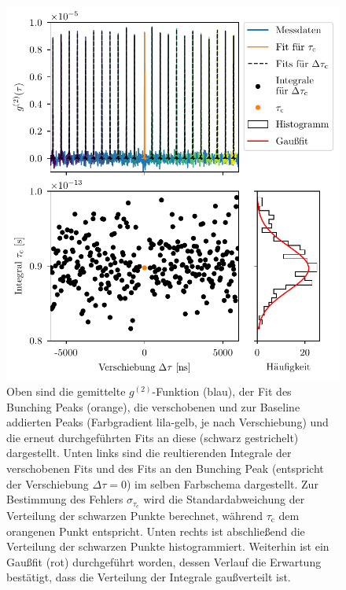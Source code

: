 \begin{figure}[hp]
    \centering
    \includegraphics{images/Analysis/integration_error.pdf}
    \caption{Oben sind die gemittelte $g^{(2)}$-Funktion (blau), der Fit des Bunching Peaks (orange), die verschobenen und zur Baseline addierten Peaks (Farbgradient lila-gelb, je nach Verschiebung) und die erneut durchgeführten Fits an diese (schwarz gestrichelt) dargestellt. Unten links sind die reultierenden Integrale der verschobenen Fits und des Fits an den Bunching Peak (entspricht der Verschiebung $\Delta\tau=0$) im selben Farbschema dargestellt. Zur Bestimmung des Fehlers $\sigma_{\tau_{\mathrm{c}}}$ wird die Standardabweichung der Verteilung der schwarzen Punkte berechnet, während $\tau_{\mathrm{c}}$ dem orangenen Punkt entspricht. Unten rechts ist abschließend die Verteilung der schwarzen Punkte histogrammiert. Weiterhin ist ein Gaußfit (rot) durchgeführt worden, dessen Verlauf die Erwartung bestätigt, dass die Verteilung der Integrale gaußverteilt ist.}
    \label{fig:Fehler auf tc}
\end{figure}

